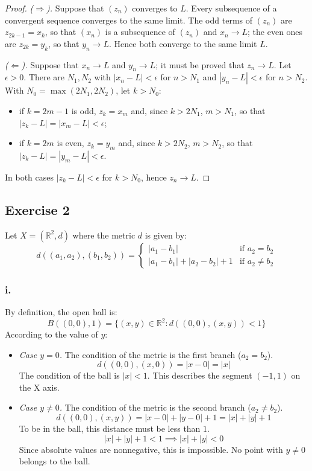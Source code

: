 \documentclass[11pt, a4paper]{article}
\begin{document}
\begin{proof}
\textit{($\Rightarrow$).} Suppose that $(z_n)$ converges to $L$. Every subsequence of a convergent
sequence converges to the same limit. The odd terms of $(z_n)$ are $z_{2k-1} = x_k$, so that
$(x_n)$ is a subsequence of $(z_n)$ and $x_n \to L$; the even ones are $z_{2k} = y_k$, so that $y_n \to L$.
Hence both converge to the same limit $L$.

\textit{($\Leftarrow$).} Suppose that $x_n \to L$ and $y_n \to L$; it must be proved that $z_n \to L$. Let
$\epsilon > 0$. There are $N_1, N_2$ with $|x_n - L| < \epsilon$ for $n > N_1$ and $|y_n - L| < \epsilon$
for $n > N_2$. With $N_0 = \max(2N_1, 2N_2)$, let $k > N_0$:
\begin{itemize}
    \item if $k = 2m - 1$ is odd, $z_k = x_m$ and, since $k > 2N_1$, $m > N_1$, so that
    $|z_k - L| = |x_m - L| < \epsilon$;
    \item if $k = 2m$ is even, $z_k = y_m$ and, since $k > 2N_2$, $m > N_2$, so that
    $|z_k - L| = |y_m - L| < \epsilon$.
\end{itemize}
In both cases $|z_k - L| < \epsilon$ for $k > N_0$, hence $z_n \to L$.
\end{proof}

\subsection*{Exercise 2}

Let $X = (\mathbb{R}^2, d)$ where the metric $d$ is given by:
$$ d((a_1, a_2), (b_1, b_2)) = \begin{cases} |a_1 - b_1| & \text{if } a_2 = b_2 \\ |a_1 - b_1| +
|a_2 - b_2| + 1 & \text{if } a_2 \neq b_2 \end{cases} $$

\subsubsection*{i.}
By definition, the open ball is:
$$ B((0,0), 1) = \{ (x,y) \in \mathbb{R}^2 : d((0,0), (x,y)) < 1 \} $$
According to the value of $y$:

\begin{itemize}
    \item \textit{Case $y = 0$.}
    The condition of the metric is the first branch ($a_2 = b_2$).
    $$ d((0,0), (x,0)) = |x - 0| = |x| $$
    The condition of the ball is $|x| < 1$.
    This describes the segment $(-1, 1)$ on the X axis.

    \item \textit{Case $y \neq 0$.}
    The condition of the metric is the second branch ($a_2 \neq b_2$).
    $$ d((0,0), (x,y)) = |x - 0| + |y - 0| + 1 = |x| + |y| + 1 $$
    To be in the ball, this distance must be less than $1$.
    $$ |x| + |y| + 1 < 1 \implies |x| + |y| < 0 $$
    Since absolute values are nonnegative, this is impossible.
    No point with $y \neq 0$ belongs to the ball.
\end{itemize}
\end{document}
